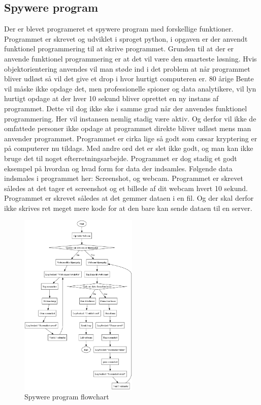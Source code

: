 \subsection{Spywere program}
Der er blevet programeret et spywere program med forskellige funktioner. Programmet er skrevet og udviklet i sproget python, i opgaven er der anvendt funktionel programmering til at skrive programmet. Grunden til at der er anvende funktionel programmering er at det vil være den smarteste løsning. Hvis objektorientering anvendes vil man støde ind i det problem at når programmet bliver udløst så vil det give et drop i hvor hurtigt computeren er. 80 årige Bente vil måske ikke opdage det, men professionelle spioner og data analytikere, vil lyn hurtigt opdage at der hver 10 sekund bliver oprettet en ny instans af programmet. Dette vil dog ikke ske i samme grad når der anvendes funktionel programmering. Her vil instansen nemlig stadig være aktiv. Og derfor vil ikke de omfattede personer ikke opdage at programmet direkte bliver udløst mens man anvender programmet. Programmet er cirka lige så godt som cæsar kryptering er på computerer nu tildags. Med andre ord det er slet ikke godt, og man kan ikke bruge det til noget efterretningsarbejde. Programmet er dog stadig et godt eksempel på hvordan og hvad form for data der indsamles. Følgende data indsmales i programmet her: Screenshot, og webcam. Programmet er skrevet således at det tager et screenshot og et billede af dit webcam hvert 10 sekund. Programmet er skrevet således at det gemmer dataen i en fil. Og der skal derfor ikke skrives ret meget mere kode for at den bare kan sende dataen til en server.
\begin{figure}[h!]
    \centering
    \includegraphics[width=0.5\textwidth]{figurs/flow.png}
    \caption{Spywere program flowchart}
    \label{fig:Spywere}
\end{figure}
